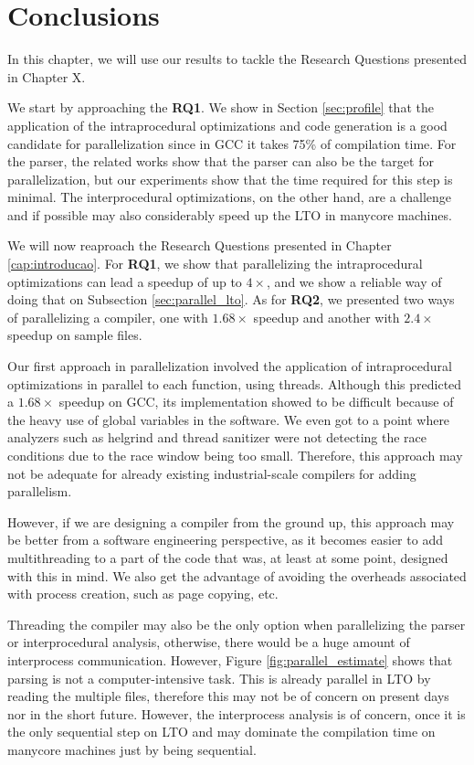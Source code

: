 \chapter{Conclusions}
\label{chap:conclusions}

In this chapter, we will use our results to tackle the Research Questions
presented in Chapter X. 

We start by approaching the \textbf{RQ1}. We show in Section \ref{sec:profile}
that the application of the intraprocedural optimizations and code generation
is a good candidate for parallelization since in GCC it takes 75\% of
compilation time.  For the parser, the related works show that the parser can
also be the target for parallelization, but our experiments show that the time
required for this step is minimal.  The interprocedural optimizations, on the
other hand, are a challenge and if possible may also considerably speed up the
LTO in manycore machines. 

We will now reaproach the Research Questions presented in Chapter
\ref{cap:introducao}.  For \textbf{RQ1}, we show that parallelizing the
intraprocedural optimizations can lead a speedup of up to $4\times$, and we
show a reliable way of doing that on Subsection \ref{sec:parallel_lto}.  As for
\textbf{RQ2}, we presented two ways of parallelizing a compiler, one with
$1.68\times$ speedup and another with $2.4\times$ speedup on sample files.

Our first approach in parallelization involved the application of intraprocedural
optimizations in parallel to each function, using threads. Although this
predicted a $1.68\times$ speedup on GCC, its implementation showed to be
difficult because of the heavy use of global variables in the software.  We
even got to a point where analyzers such as helgrind and thread sanitizer were
not detecting the race conditions due to the race window being too small.
Therefore, this approach may not be adequate for already existing
industrial-scale compilers for adding parallelism.

However, if we are designing a compiler from the ground up, this approach may
be better from a software engineering perspective, as it becomes easier to add
multithreading to a part of the code that was, at least at some point, designed
with this in mind. We also get the advantage of avoiding the overheads
associated with process creation, such as page copying, etc.

Threading the compiler may also be the only option when parallelizing the
parser or interprocedural analysis, otherwise, there would be a huge amount of
interprocess communication. However, Figure \ref{fig:parallel_estimate} shows
that parsing is not a computer-intensive task. This is already parallel in LTO
by reading the multiple files, therefore this may not be of concern on present
days nor in the short future. However, the interprocess analysis is of concern,
once it is the only sequential step on LTO and may dominate the compilation
time on manycore machines just by being sequential.

